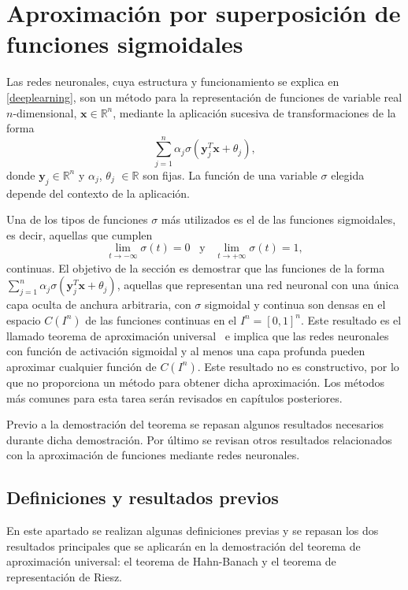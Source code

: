 
\chapter{Aproximación por superposición de funciones sigmoidales}\label{ch:aproximacion}

Las redes neuronales, cuya estructura y funcionamiento se explica en \autoref{deeplearning}, son un método para la representación de funciones de variable real $n$-dimensional, $\textbf{x} \in \mathbb{R}^n$, mediante la aplicación sucesiva de transformaciones de la forma $$ \sum_{j=1}^n\alpha_j\sigma(\textbf{y}^T_j\textbf{x} + \theta_j),$$ donde $\textbf{y}_j \in \mathbb{R}^n$ y $\alpha_j$, $\theta_j$ $\in \mathbb{R}$ son fijas. La función de una variable $\sigma$ elegida depende del contexto de la aplicación.

Una de los tipos de funciones $\sigma$ más utilizados es el de las funciones sigmoidales, es decir, aquellas que cumplen $$ \lim_{t \rightarrow - \infty} \sigma(t) = 0 \;\;\; \text{y} \;\;\; \lim_{t \rightarrow + \infty} \sigma(t) = 1,$$ continuas. El objetivo de la sección es demostrar que las funciones de la forma $\sum_{j=1}^n\alpha_j\sigma(\textbf{y}^T_j\textbf{x} + \theta_j)$, aquellas que representan una red neuronal con una única capa oculta de anchura arbitraria, con $\sigma$ sigmoidal y continua son densas en el espacio $C(I^n)$ de las funciones continuas en el $I^n = [0,1]^n$. Este resultado es el llamado teorema de aproximación universal~\cite{cybenko1989approximation} e implica que las redes neuronales con función de activación sigmoidal y al menos una capa profunda pueden aproximar cualquier función de $C(I^n)$. Este resultado no es constructivo, por lo que no proporciona un método para obtener dicha aproximación. Los métodos más comunes para esta tarea serán revisados en capítulos posteriores.

 Previo a la demostración del teorema se repasan algunos resultados necesarios durante dicha demostración. Por último se revisan otros resultados relacionados con la aproximación de funciones mediante redes neuronales.

\section{Definiciones y resultados previos}

En este apartado se realizan algunas definiciones previas y se repasan los dos resultados principales que se aplicarán en la demostración del teorema de aproximación universal: el teorema de Hahn-Banach y el teorema de representación de Riesz.

